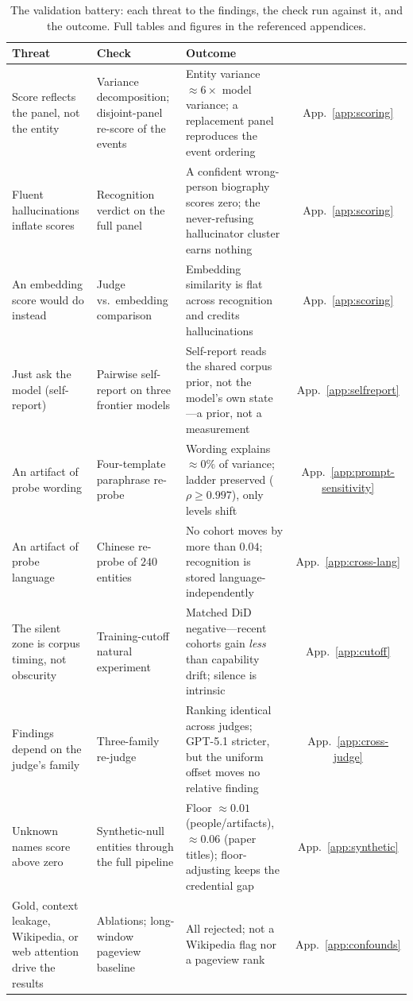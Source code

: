 \begin{table}[htbp]
\centering
\small
\caption{The validation battery: each threat to the findings, the check run against it, and the outcome. Full tables and figures in the referenced appendices.}
\label{tab:threats}
\begin{tabular}{>{\raggedright\arraybackslash}p{3.4cm}>{\raggedright\arraybackslash}p{3.6cm}>{\raggedright\arraybackslash}p{5.6cm}c}
\toprule
\textbf{Threat} & \textbf{Check} & \textbf{Outcome} & \\
\midrule
Score reflects the panel, not the entity & Variance decomposition; disjoint-panel re-score of the events & Entity variance ${\approx}6\times$ model variance; a replacement panel reproduces the event ordering & App.~\ref{app:scoring} \\
Fluent hallucinations inflate scores & Recognition verdict on the full panel & A confident wrong-person biography scores zero; the never-refusing hallucinator cluster earns nothing & App.~\ref{app:scoring} \\
An embedding score would do instead & Judge vs.\ embedding comparison & Embedding similarity is flat across recognition and credits hallucinations & App.~\ref{app:scoring} \\
Just ask the model (self-report) & Pairwise self-report on three frontier models & Self-report reads the shared corpus prior, not the model's own state---a prior, not a measurement & App.~\ref{app:selfreport} \\
An artifact of probe wording & Four-template paraphrase re-probe & Wording explains ${\approx}0\%$ of variance; ladder preserved ($\rho \geq 0.997$), only levels shift & App.~\ref{app:prompt-sensitivity} \\
An artifact of probe language & Chinese re-probe of $240$ entities & No cohort moves by more than $0.04$; recognition is stored language-independently & App.~\ref{app:cross-lang} \\
The silent zone is corpus timing, not obscurity & Training-cutoff natural experiment & Matched DiD negative---recent cohorts gain \emph{less} than capability drift; silence is intrinsic & App.~\ref{app:cutoff} \\
Findings depend on the judge's family & Three-family re-judge & Ranking identical across judges; GPT-5.1 stricter, but the uniform offset moves no relative finding & App.~\ref{app:cross-judge} \\
Unknown names score above zero & Synthetic-null entities through the full pipeline & Floor ${\approx}0.01$ (people/artifacts), ${\approx}0.06$ (paper titles); floor-adjusting keeps the credential gap & App.~\ref{app:synthetic} \\
Gold, context leakage, Wikipedia, or web attention drive the results & Ablations; long-window pageview baseline & All rejected; not a Wikipedia flag nor a pageview rank & App.~\ref{app:confounds} \\
\bottomrule
\end{tabular}
\end{table}

